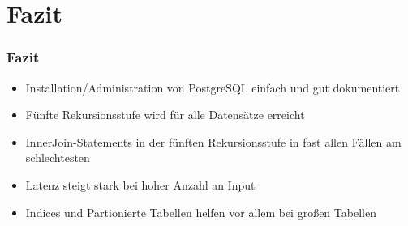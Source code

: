 \documentclass[hyperref={pdfpagelabels=false}]{beamer}
\begin{document}
\section{Fazit}
\begin{frame}
\frametitle{Fazit}
	\begin{itemize}
		\item Installation/Administration von PostgreSQL einfach und gut dokumentiert
		\item Fünfte Rekursionsstufe wird für alle Datensätze erreicht
		\item InnerJoin-Statements in der fünften Rekursionsstufe in fast allen Fällen am schlechtesten
		\item Latenz steigt stark bei hoher Anzahl an Input
		\item Indices und Partionierte Tabellen helfen vor allem bei großen Tabellen
\end{itemize}	
\end{frame}
\end{document}
